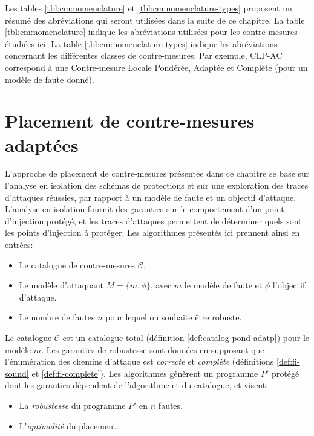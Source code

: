             Les tables \ref{tbl:cm:nomenclature} et \ref{tbl:cm:nomenclature-types} proposent un résumé des abréviations qui seront utilisées dans la suite de ce chapitre. La table \ref{tbl:cm:nomenclature} indique les abréviations utilisées pour les contre-mesures étudiées ici. La table \ref{tbl:cm:nomenclature-types} indique les abréviations concernant les différentes classes de contre-mesures. Par exemple, \gls{CLP}-AC correspond à une Contre-mesure Locale Pondérée, Adaptée et Complète (pour un modèle de faute donné).
            
    \section{Placement de contre-mesures adaptées}
    \label{sec:placement}

        L'approche de placement de contre-mesures présentée dans ce chapitre se base sur l'analyse en isolation des schémas de protections et sur une exploration des traces d'attaques réussies, par rapport à un modèle de faute et un objectif d'attaque.
        L'analyse en isolation fournit des garanties sur le comportement d'un point d'injection protégé, et les traces d'attaques permettent de déterminer quels sont les points d'injection à protéger.
        Les algorithmes présentés ici prennent ainsi en entrées:
        \begin{itemize}
            \item Le catalogue de contre-mesures $\mathcal{C}$.
            \item Le modèle d'attaquant $M = \{m, \phi\}$, avec $m$ le modèle de faute et $\phi$ l'objectif d'attaque.
            \item Le nombre de fautes $n$ pour lequel on souhaite être robuste.
        \end{itemize}

        Le catalogue $\mathcal{C}$ est un catalogue total (définition \ref{def:catalog-pond-adatp}) pour le modèle $m$.
        Les garanties de robustesse sont données en supposant que l'énumération des chemins d'attaque est \textit{correcte} et \textit{complète} (définitions \ref{def:fi-sound} et \ref{def:fi-complete}).
        Les algorithmes génèrent un programme $P'$ protégé dont les garanties dépendent de l'algorithme et du catalogue, et visent:
        \begin{itemize}
            \item La \textit{robustesse} du programme $P'$ en $n$ fautes.
            \item L'\textit{optimalité} du placement.
        \end{itemize}

